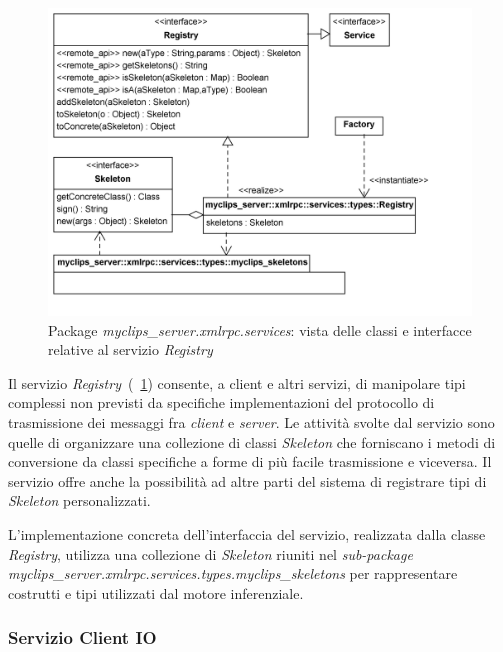 \begin{figure}[h]
\centering
\includegraphics[width=1\textwidth]{Immagini/Capitolo3/Classi/myclips_server_services_Registry.png}
\caption{Package \emph{myclips\_server.xmlrpc.services}: vista delle classi e interfacce relative al servizio \emph{Registry}}\label{fig:class-myclips-server-services-registry}
\end{figure}

Il servizio \emph{Registry}~(\figurename~\ref{fig:class-myclips-server-services-registry}) consente, a client e altri servizi, di manipolare tipi complessi non previsti da specifiche implementazioni del protocollo di trasmissione dei messaggi fra \emph{client} e \emph{server}. Le attività svolte dal servizio sono quelle di organizzare una collezione di classi \emph{Skeleton} che forniscano i metodi di conversione da classi specifiche a forme di più facile trasmissione e viceversa.
Il servizio offre anche la possibilità ad altre parti del sistema di registrare tipi di \emph{Skeleton} personalizzati.

L'implementazione concreta dell'interfaccia del servizio, realizzata dalla classe \emph{Registry}, utilizza una collezione di \emph{Skeleton} riuniti nel \emph{sub-package} \emph{myclips\_server.xmlrpc.services.types.myclips\_skeletons} per rappresentare costrutti e tipi utilizzati dal motore inferenziale.

\subsubsection{Servizio Client IO}

